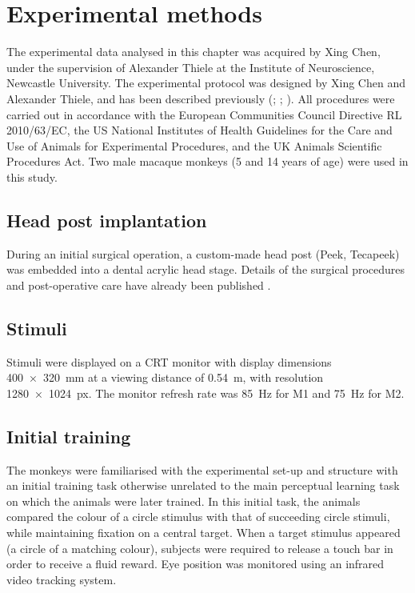 \section{Experimental methods}
\label{ch:exp}

The experimental data analysed in this chapter was acquired by Xing Chen, under the supervision of Alexander Thiele at the Institute of Neuroscience, Newcastle University.
The experimental protocol was designed by Xing Chen and Alexander Thiele, and has been described previously (\citealp{Chen2013thesis}; \citealp{Chen2013}; \citealp{Chen2014}). %
All procedures were carried out in accordance with the European Communities Council Directive RL 2010/63/EC, the US National Institutes of Health Guidelines for the Care and Use of Animals for Experimental Procedures, and the UK Animals Scientific Procedures Act.
Two male macaque monkeys (\num{5} and \num{14} years of age) were used in this study.


\subsection{Head post implantation}

During an initial surgical operation, a custom-made head post (Peek, Tecapeek) was embedded into a dental acrylic head stage.
Details of the surgical procedures and post-operative care have already been published \citep[see][for details]{Thiele2006}.


\subsection{Stimuli}

Stimuli were displayed on a \ac{CRT} monitor with display dimensions \SI{400x320}{\milli\metre} at a viewing distance of \SI{0.54}{\metre}, with resolution \SI{1280x1024}{px}.
The monitor refresh rate was \SI{85}{Hz} for \ac{M1} and \SI{75}{Hz} for \ac{M2}.


\subsection{Initial training}

The monkeys were familiarised with the experimental set-up and structure with an initial training task otherwise unrelated to the main perceptual learning task on which the animals were later trained.
In this initial task, the animals compared the colour of a circle stimulus with that of succeeding circle stimuli, while maintaining fixation on a central target.
When a target stimulus appeared (a circle of a matching colour), subjects were required to release a touch bar in order to receive a fluid reward.
Eye position was monitored using an infrared video tracking system.%


